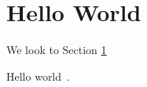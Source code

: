 \documentclass[12pt,]{article}
\begin{document}
\section{Hello World}\label{intro}


We look to Section \ref{intro}

Hello world~\cite{savitz:13}. 





\end{document}
